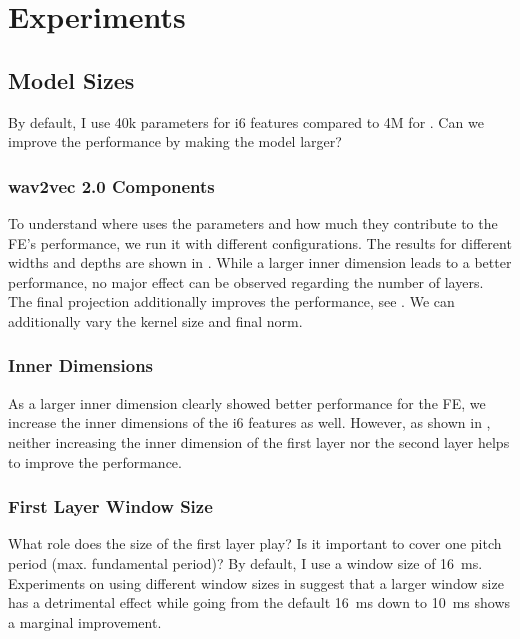 \documentclass{INTERSPEECH2023}
\begin{document}
\section{Experiments}
\subsection{Model Sizes}
By default, I use 40k parameters for i6 features compared to 4M for \wvtwo.
Can we improve the performance by making the model larger?
\subsubsection{wav2vec 2.0 Components}
To understand where \wvtwo uses the parameters and how much they contribute to the \gls{FE}'s performance, we run it with different configurations.
The results for different widths and depths are shown in .
While a larger inner dimension leads to a better performance, no major effect can be observed regarding the number of layers.
The final projection additionally improves the performance, see .
We can additionally vary the kernel size and final norm.

\subsubsection{Inner Dimensions}
As a larger inner dimension clearly showed better performance for the \wvtwo \gls{FE}, we increase the inner dimensions of the i6 features as well.
However, as shown in , neither increasing the inner dimension of the first layer nor the second layer helps to improve the performance.

\subsubsection{First Layer Window Size}
What role does the size of the first layer play? Is it important to cover one pitch period (max. fundamental period)?
By default, I use a window size of \SI{16}{\milli\second}.
Experiments on using different window sizes in  suggest that a larger window size has a detrimental effect while going from the default \SI{16}{\milli\second} down to \SI{10}{\milli\second} shows a marginal improvement.
\end{document}
